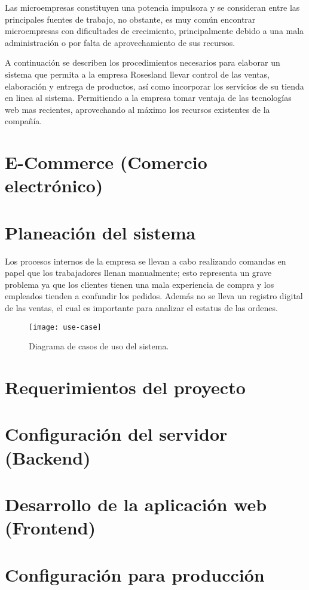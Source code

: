 Las microempresas constituyen una potencia impulsora y se consideran entre las principales fuentes de trabajo, no obstante, es muy común encontrar microempresas con dificultades de crecimiento, principalmente debido a una mala administración o por falta de aprovechamiento de sus recursos.
\vspace{0.8cm}

A continuación se describen los procedimientos necesarios para elaborar un sistema que permita a la empresa Rosesland llevar control de las ventas, elaboración y entrega de productos, así como incorporar los servicios de su tienda en linea al sistema. Permitiendo a la empresa tomar ventaja de las tecnologías web mas recientes, aprovechando al máximo los recursos existentes de la compañía.

\section{E-Commerce (Comercio electrónico)}


\newpage
\section{Planeación del sistema}
Los procesos internos de la empresa se llevan a cabo realizando comandas en papel que los trabajadores llenan manualmente; esto representa un grave problema ya que los clientes tienen una mala experiencia de compra y los empleados tienden a confundir los pedidos. Además no se lleva un registro digital de las ventas, el cual es importante para analizar el estatus de las ordenes. 
\vspace{0.8cm}

\begin{figure}[H]
  \centering
  \texttt{[image: use-case]}
  \caption{Diagrama de casos de uso del sistema.}
\end{figure}
\vspace{0.8cm}

\section{Requerimientos del proyecto}


\newpage
\section{Configuración del servidor (Backend)}


\newpage
\section{Desarrollo de la aplicación web (Frontend)}


\newpage
\section{Configuración para producción}
